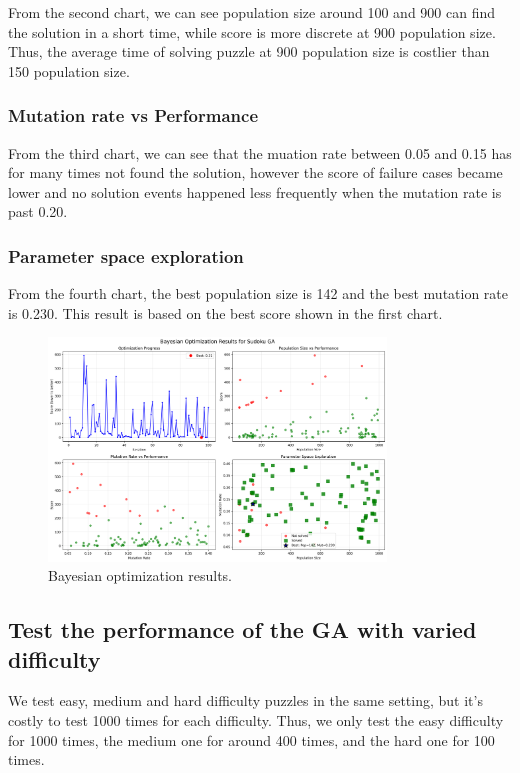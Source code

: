 From the second chart, we can see population size around 100 and 900 can find the solution in a short time, while score is more discrete at 900 population size. Thus, the average time of solving puzzle at 900 population size is costlier than 150 population size.

\subsubsection{Mutation rate vs Performance}

From the third chart, we can see that the muation rate between 0.05 and 0.15 has for many times not found the solution, however the score of failure cases became lower and no solution events happened less frequently when the mutation rate is past 0.20.

\subsubsection{Parameter space exploration}

From the fourth chart, the best population size is 142 and the best mutation rate is 0.230. This result is based on the best score shown in the first chart.

\begin{figure}[H]
\centering
\includegraphics[width=0.8\textwidth]{resources/bayesian_optimization_results.png}
\caption{Bayesian optimization results.}
\label{fig:bayesian_optimization_results}
\end{figure}

\subsection{Test the performance of the GA with varied difficulty}

We test easy, medium and hard difficulty puzzles in the same setting, but it's costly to test 1000 times for each difficulty. Thus, we only test the easy difficulty for 1000 times, the medium one for around 400 times, and the hard one for 100 times.

